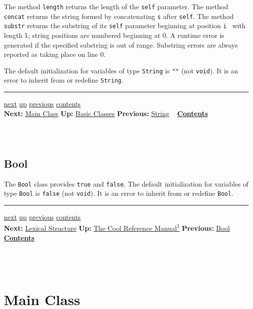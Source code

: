 \documentclass[]{article}
\begin{document}
The method \texttt{length} returns the length of the \texttt{self}
parameter. The method \texttt{concat} returns the string formed by
concatenating \texttt{s} after \texttt{self}. The method \texttt{substr}
returns the substring of its \texttt{self} parameter beginning at
position \texttt{i } with length \texttt{l}; string positions are
numbered beginning at 0. A runtime error is generated if the specified
substring is out of range. Substring errors are always reported as
taking place on line 0.

The default initialization for variables of type \texttt{String} is
\texttt{""} (not \texttt{void}). It is an error to inherit from or
redefine \texttt{String}.

\begin{center}\rule{3in}{0.4pt}\end{center}

\href{node32.html}{next} \href{node26.html}{up}
\href{node30.html}{previous} \href{node1.html}{contents} \\
\textbf{Next:} \href{node32.html}{Main Class} \textbf{Up:}
\href{node26.html}{Basic Classes} \textbf{Previous:}
\href{node30.html}{String} ~ \textbf{\href{node1.html}{Contents}} \\ \\

\subsection{\\ Bool}

The \texttt{Bool} class provides \texttt{true} and \texttt{false}. The
default initialization for variables of type \texttt{Bool} is
\texttt{false} (not \texttt{void}). It is an error to inherit from or
redefine \texttt{Bool}.

\begin{center}\rule{3in}{0.4pt}\end{center}

\href{node33.html}{next} \href{cool-manual.html}{up}
\href{node31.html}{previous} \href{node1.html}{contents} \\
\textbf{Next:} \href{node33.html}{Lexical Structure} \textbf{Up:}
\href{cool-manual.html}{The Cool Reference Manual\textsuperscript{1}}
\textbf{Previous:} \href{node31.html}{Bool} ~
\textbf{\href{node1.html}{Contents}} \\ \\

\section{\\ Main Class}
\end{document}
